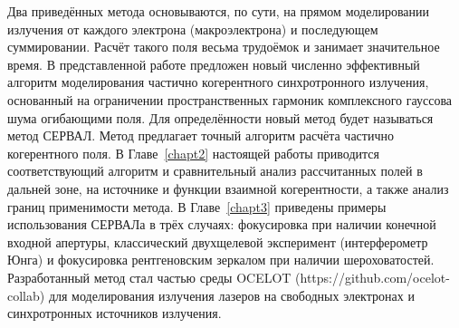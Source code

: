 Два приведённых метода основываются, по сути, на прямом моделировании излучения от каждого электрона (макроэлектрона) и последующем суммировании. Расчёт такого поля весьма трудоёмок и занимает значительное время. В представленной работе предложен новый численно эффективный алгоритм моделирования частично когерентного синхротронного излучения, основанный на ограничении пространственных гармоник комплексного гауссова шума огибающими поля. Для определённости новый метод будет называться метод СЕРВАЛ. Метод предлагает точный алгоритм расчёта частично когерентного поля. В Главе~\ref{chapt2} настоящей работы приводится соответствующий алгоритм и сравнительный анализ рассчитанных полей в дальней зоне, на источнике и функции взаимной когерентности, а также анализ границ применимости метода. В Главе~\ref{chapt3} приведены примеры использования СЕРВАЛа в трёх случаях: фокусировка при наличии конечной входной апертуры, классический двухщелевой эксперимент (интерферометр Юнга) и фокусировка рентгеновским зеркалом при наличии шероховатостей. Разработанный метод стал частью среды OCELOT (https://github.com/ocelot-collab) для моделирования излучения лазеров на свободных электронах и синхротронных источников излучения. 



